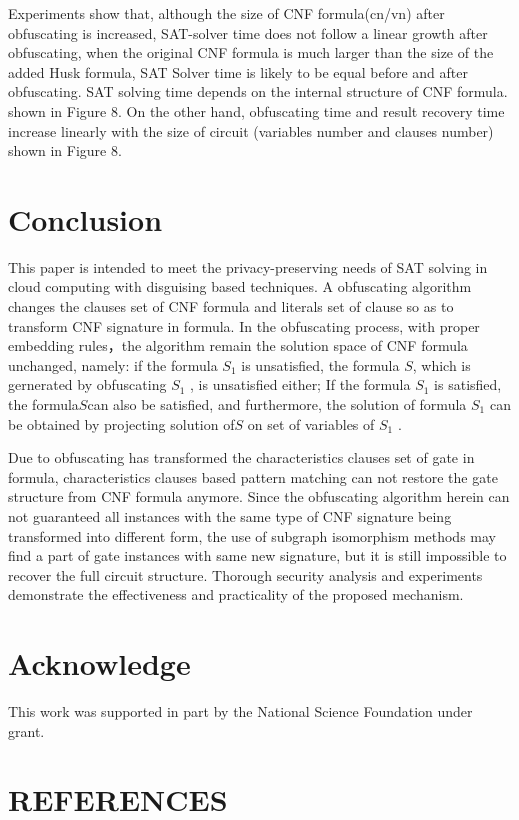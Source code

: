 \documentclass[runningheads,a4paper]{llncs}
\begin{document}
Experiments show that, although the size of CNF formula(cn/vn) after obfuscating is increased,
SAT-solver time does not follow a linear growth after obfuscating, when the original CNF formula is much larger than the size of the added Husk formula,
SAT Solver time is likely to be equal before and after obfuscating. SAT solving time depends on the internal structure of CNF formula. shown in Figure 8.
On the other hand, obfuscating time and result recovery time increase linearly with the size of circuit (variables number and clauses number) shown in Figure 8.

\section{Conclusion} 

This paper is intended to meet the privacy-preserving needs of SAT solving in cloud computing with disguising based techniques.
A obfuscating algorithm changes the clauses set of CNF formula and literals set of clause so as to transform CNF signature in formula. 
In the obfuscating process, with proper embedding rules，the algorithm remain the solution space of CNF formula unchanged, 
namely: if the formula $S_1$  is unsatisfied, the formula $S$, which is gernerated by obfuscating $S_1$ , is unsatisfied either;
If the formula $S_1$  is satisfied, the formula$S$can also be satisfied, 
and furthermore, the solution of formula $S_1$  can be obtained by projecting solution of$S$ on set of variables of $S_1$  .

Due to obfuscating has transformed the characteristics clauses set of gate in formula,
characteristics clauses based pattern matching can not restore the gate structure from CNF formula anymore.
Since the obfuscating algorithm herein can not guaranteed all instances with the same type of CNF signature being transformed into different form, 
the use of subgraph isomorphism methods may find a part of gate instances with same new signature,
but it is still impossible to recover the full circuit structure. 
Thorough security analysis and experiments demonstrate the effectiveness and practicality of the proposed mechanism.
\section{Acknowledge} 

This work was supported in part by the National Science Foundation under grant.

\section{REFERENCES} 
\end{document}
